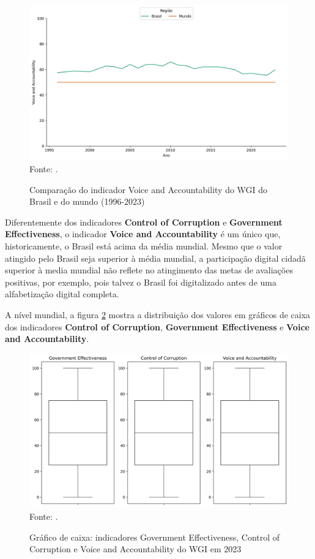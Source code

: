 \begin{figure}[H]
	\centering
	\caption{Comparação do indicador Voice and Accountability do WGI do Brasil e do mundo (1996-2023)}
	\includegraphics[width=1\linewidth]{figuras/comparacao_wgi_va_brasil_mundo}
	\label{fig:comparacao_wgi_va_brasil_mundo}
	\footnotesize{Fonte: \cite{wgi_dados}.}
\end{figure}

Diferentemente dos indicadores  \textbf{Control of Corruption} e \textbf{Government Effectiveness}, o indicador \textbf{Voice and Accountability} é um único que, historicamente, o Brasil está acima da média mundial. Mesmo que o valor atingido pelo Brasil seja superior à média mundial, a participação digital cidadã superior à media mundial não reflete no atingimento das metas de avaliações positivas, por exemplo, pois talvez o Brasil foi digitalizado antes de uma alfabetização digital completa.

A nível mundial, a figura \ref{fig:quartis_wgi_ge_cc_va} mostra a distribuição dos valores em gráficos de caixa dos indicadores \textbf{Control of Corruption}, \textbf{Government Effectiveness} e \textbf{Voice and Accountability}.

\begin{figure}[H]
	\centering
	\caption{Gráfico de caixa: indicadores Government Effectiveness, Control of Corruption e Voice and Accountability do WGI em 2023}
	\includegraphics[width=1\linewidth]{figuras/quartis_wgi_ge_cc_va}
	\label{fig:quartis_wgi_ge_cc_va}
	\footnotesize{Fonte: \cite{wgi_dados}.}
\end{figure}

